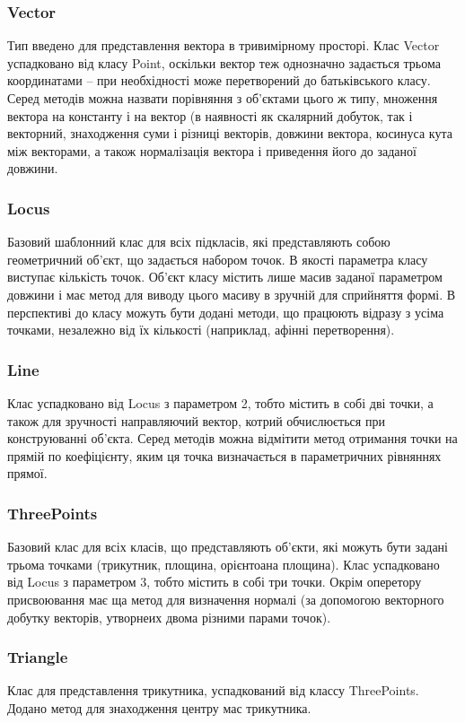 \documentclass[a4paper,12pt]{article}
\begin{document}
\subsubsection{Vector}
Тип введено для представлення вектора в тривимірному просторі. Клас Vector успадковано від класу Point, оскільки вектор теж однозначно задається трьома координатами -- при необхідності може перетворений до батьківського класу. Серед методів можна назвати порівняння з об’єктами цього ж типу, множення вектора на константу і на вектор (в наявності як скалярний добуток, так і векторний, знаходження суми і різниці векторів, довжини вектора, косинуса кута між векторами, а також нормалізація вектора і приведення його до заданої довжини.

\subsubsection{Locus}
Базовий шаблонний клас для всіх підкласів, які представляють собою геометричний об'єкт, що задається набором точок. В якості параметра класу виступає кількість точок. Об’єкт класу містить лише масив заданої параметром довжини і має метод для виводу цього масиву в зручній для сприйняття формі. В перспективі до класу можуть бути додані методи, що працюють відразу з усіма точками, незалежно від їх кількості (наприклад, афінні перетворення).

\subsubsection{Line}
Клас успадковано від Locus з параметром 2, тобто містить в собі дві точки, а також для зручності направляючий вектор, котрий обчислюється при конструюванні об’єкта. Серед методів можна відмітити метод отримання точки на прямій по коефіцієнту, яким ця точка визначається в параметричних рівняннях прямої.

\subsubsection{ThreePoints}
Базовий клас для всіх класів, що представляють об’єкти, які можуть бути задані трьома точками (трикутник, площина, орієнтоана площина). Клас успадковано від Locus з параметром 3, тобто містить в собі три точки. Окрім оперетору присвоювання має ща метод для визначення нормалі (за допомогою векторного добутку векторів, утворнеих двома різними парами точок).

\subsubsection{Triangle}
Клас для представлення трикутника, успадкований від классу ThreePoints. Додано метод для знаходження центру мас трикутника.
\end{document}
